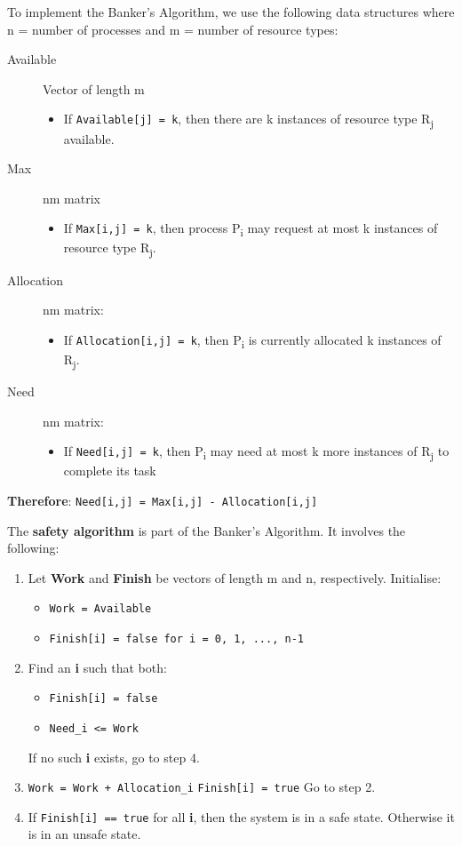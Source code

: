 \documentclass[11pt]{article}
\begin{document}
\begin{enumerate}
To implement the Banker's Algorithm, we use the following data structures where n = number of processes and m = number of resource types:
\begin{description}
\item[{Available}] Vector of length m
\begin{itemize}
\item If \texttt{Available[j] = k}, then there are k instances of resource type R\textsubscript{j} available.
\end{itemize}
\item[{Max}] nm matrix
\begin{itemize}
\item If \texttt{Max[i,j] = k}, then process P\textsubscript{i} may request at most k instances of resource type R\textsubscript{j}.
\end{itemize}
\item[{Allocation}] nm matrix:
\begin{itemize}
\item If \texttt{Allocation[i,j] = k}, then P\textsubscript{i} is currently allocated k instances of R\textsubscript{j}.
\end{itemize}
\item[{Need}] nm matrix:
\begin{itemize}
\item If \texttt{Need[i,j] = k}, then P\textsubscript{i} may need at most k more instances of R\textsubscript{j} to complete its task
\end{itemize}
\end{description}

\textbf{Therefore}: \texttt{Need[i,j] = Max[i,j] - Allocation[i,j]}

The \textbf{safety algorithm} is part of the Banker's Algorithm.
It involves the following:
\begin{enumerate}
\item Let \textbf{Work} and \textbf{Finish} be vectors of length m and n, respectively.
Initialise:
\begin{itemize}
\item \texttt{Work = Available}
\item \texttt{Finish[i] = false for i = 0, 1, ..., n-1}
\end{itemize}
\item Find an \textbf{i} such that both:
\begin{itemize}
\item \texttt{Finish[i] = false}
\item \texttt{Need\_i <= Work}
\end{itemize}
If no such \textbf{i} exists, go to step 4.
\item \texttt{Work = Work + Allocation\_i}
\texttt{Finish[i] = true}
Go to step 2.
\item If \texttt{Finish[i] == true} for all \textbf{i}, then the system is in a safe state. Otherwise it is in an unsafe state.
\end{enumerate}
\end{enumerate}
\end{document}
